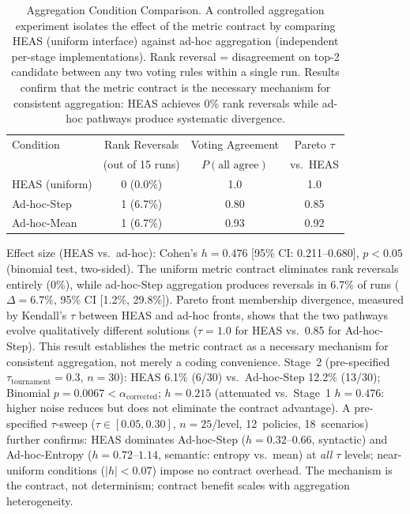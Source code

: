 \documentclass{wscpaperproc}
\begin{document}
\begin{table}[ht]
\centering\small
\caption{Aggregation Condition Comparison. A controlled aggregation experiment isolates
the effect of the metric contract by comparing HEAS (uniform interface) against ad-hoc
aggregation (independent per-stage implementations). Rank reversal = disagreement on
top-2 candidate between any two voting rules within a single run. Results confirm that the metric contract is the necessary mechanism for consistent aggregation: HEAS achieves 0\% rank reversals while ad-hoc pathways produce systematic divergence.}
\label{tab:agg-control}
\begin{tabular}{lccc}
\toprule
Condition & Rank Reversals & Voting Agreement & Pareto $\tau$ \\
& (out of 15 runs) & $P(\text{all agree})$ & vs.\ HEAS \\
\midrule
HEAS (uniform) & 0 (0.0\%) & 1.0 & 1.0 \\
Ad-hoc-Step & 1 (6.7\%) & 0.80 & 0.85 \\
Ad-hoc-Mean & 1 (6.7\%) & 0.93 & 0.92 \\
\bottomrule
\end{tabular}
\end{table}

Effect size (HEAS vs.\ ad-hoc): Cohen's $h = 0.476$ [95\% CI: 0.211--0.680],
$p < 0.05$ (binomial test, two-sided). The uniform metric contract eliminates
rank reversals entirely (0\%), while ad-hoc-Step aggregation produces reversals in 6.7\%
of runs ($\Delta = 6.7\%$, 95\% CI [1.2\%, 29.8\%]). Pareto front membership divergence,
measured by Kendall's $\tau$ between HEAS and ad-hoc fronts, shows that the two
pathways evolve qualitatively different solutions ($\tau = 1.0$ for HEAS vs.\ 0.85 for
Ad-hoc-Step). This result establishes the metric contract as a necessary mechanism for consistent
aggregation, not merely a coding convenience. Stage~2 (pre-specified $\tau_\text{tournament}\!=\!0.3$, $n\!=\!30$): HEAS 6.1\% (6/30)
vs.\ Ad-hoc-Step 12.2\% (13/30); Binomial $p\!=\!0.0067 < \alpha_\text{corrected}$;
$h\!=\!0.215$ (attenuated vs.\ Stage~1 $h\!=\!0.476$: higher noise reduces but does
not eliminate the contract advantage). A pre-specified $\tau$-sweep ($\tau \in [0.05,
0.30]$, $n\!=\!25$/level, 12~policies, 18~scenarios) further confirms: HEAS dominates
Ad-hoc-Step ($h\!=\!0.32$--$0.66$, syntactic) and Ad-hoc-Entropy ($h\!=\!0.72$--$1.14$,
semantic: entropy vs.\ mean) at \emph{all} $\tau$ levels; near-uniform conditions
($|h|\!<\!0.07$) impose no contract overhead. The mechanism is the contract, not
determinism; contract benefit scales with aggregation heterogeneity.
\end{document}
